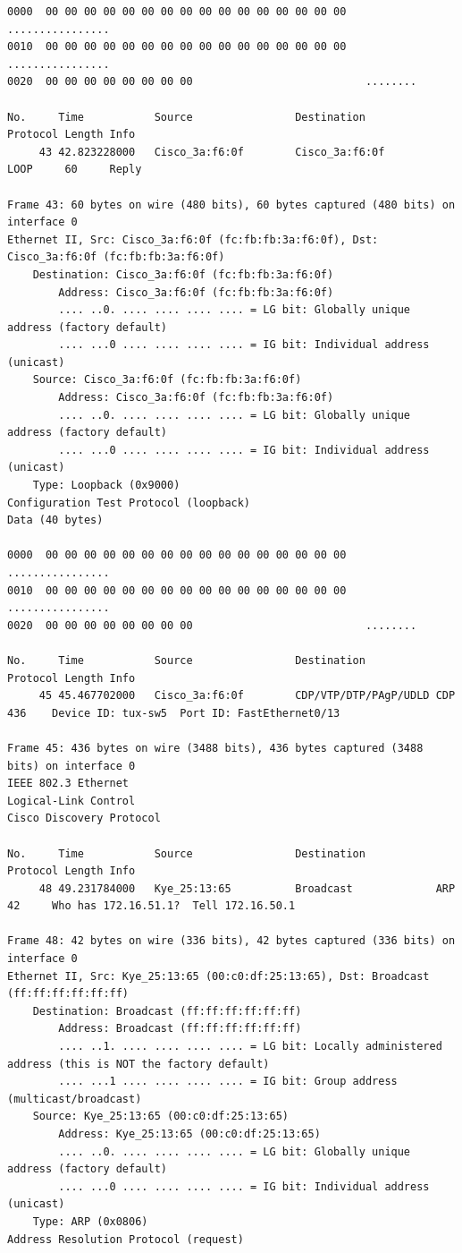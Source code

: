 \documentclass[a4paper,11pt]{article}
\begin{document}
\begin{lstlisting}
0000  00 00 00 00 00 00 00 00 00 00 00 00 00 00 00 00   ................
0010  00 00 00 00 00 00 00 00 00 00 00 00 00 00 00 00   ................
0020  00 00 00 00 00 00 00 00                           ........

No.     Time           Source                Destination           Protocol Length Info
     43 42.823228000   Cisco_3a:f6:0f        Cisco_3a:f6:0f        LOOP     60     Reply

Frame 43: 60 bytes on wire (480 bits), 60 bytes captured (480 bits) on interface 0
Ethernet II, Src: Cisco_3a:f6:0f (fc:fb:fb:3a:f6:0f), Dst: Cisco_3a:f6:0f (fc:fb:fb:3a:f6:0f)
    Destination: Cisco_3a:f6:0f (fc:fb:fb:3a:f6:0f)
        Address: Cisco_3a:f6:0f (fc:fb:fb:3a:f6:0f)
        .... ..0. .... .... .... .... = LG bit: Globally unique address (factory default)
        .... ...0 .... .... .... .... = IG bit: Individual address (unicast)
    Source: Cisco_3a:f6:0f (fc:fb:fb:3a:f6:0f)
        Address: Cisco_3a:f6:0f (fc:fb:fb:3a:f6:0f)
        .... ..0. .... .... .... .... = LG bit: Globally unique address (factory default)
        .... ...0 .... .... .... .... = IG bit: Individual address (unicast)
    Type: Loopback (0x9000)
Configuration Test Protocol (loopback)
Data (40 bytes)

0000  00 00 00 00 00 00 00 00 00 00 00 00 00 00 00 00   ................
0010  00 00 00 00 00 00 00 00 00 00 00 00 00 00 00 00   ................
0020  00 00 00 00 00 00 00 00                           ........

No.     Time           Source                Destination           Protocol Length Info
     45 45.467702000   Cisco_3a:f6:0f        CDP/VTP/DTP/PAgP/UDLD CDP      436    Device ID: tux-sw5  Port ID: FastEthernet0/13  

Frame 45: 436 bytes on wire (3488 bits), 436 bytes captured (3488 bits) on interface 0
IEEE 802.3 Ethernet 
Logical-Link Control
Cisco Discovery Protocol

No.     Time           Source                Destination           Protocol Length Info
     48 49.231784000   Kye_25:13:65          Broadcast             ARP      42     Who has 172.16.51.1?  Tell 172.16.50.1

Frame 48: 42 bytes on wire (336 bits), 42 bytes captured (336 bits) on interface 0
Ethernet II, Src: Kye_25:13:65 (00:c0:df:25:13:65), Dst: Broadcast (ff:ff:ff:ff:ff:ff)
    Destination: Broadcast (ff:ff:ff:ff:ff:ff)
        Address: Broadcast (ff:ff:ff:ff:ff:ff)
        .... ..1. .... .... .... .... = LG bit: Locally administered address (this is NOT the factory default)
        .... ...1 .... .... .... .... = IG bit: Group address (multicast/broadcast)
    Source: Kye_25:13:65 (00:c0:df:25:13:65)
        Address: Kye_25:13:65 (00:c0:df:25:13:65)
        .... ..0. .... .... .... .... = LG bit: Globally unique address (factory default)
        .... ...0 .... .... .... .... = IG bit: Individual address (unicast)
    Type: ARP (0x0806)
Address Resolution Protocol (request)


\end{lstlisting}
\end{document}
